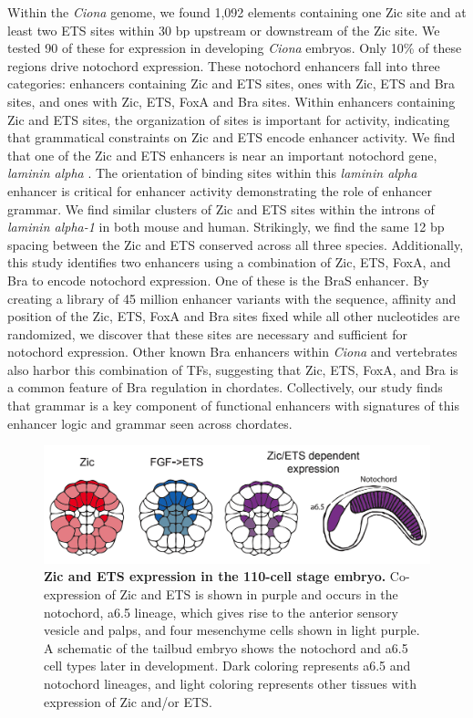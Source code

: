 Within the \textit{Ciona} genome, we found 1,092 elements containing one Zic site and at least two ETS sites within 30 bp upstream or downstream of the Zic site. We tested 90 of these for expression in developing \textit{Ciona} embryos. Only 10\% of these regions drive notochord expression. These notochord enhancers fall into three categories: enhancers containing Zic and ETS sites, ones with Zic, ETS and Bra sites, and ones with Zic, ETS, FoxA and Bra sites. Within enhancers containing Zic and ETS sites, the organization of sites is important for activity, indicating that grammatical constraints on Zic and ETS encode enhancer activity. We find that one of the Zic and ETS enhancers is near an important notochord gene, \textit{laminin alpha} \cite{veeman2008}. The orientation of binding sites within this \textit{laminin alpha} enhancer is critical for enhancer activity demonstrating the role of enhancer grammar.  We find similar clusters of Zic and ETS sites within the introns of \textit{laminin alpha-1} in both mouse and human. Strikingly, we find the same 12 bp spacing between the Zic and ETS conserved across all three species. Additionally, this study identifies two enhancers using a combination of Zic, ETS, FoxA, and Bra to encode notochord expression. One of these is the BraS enhancer. By creating a library of 45 million enhancer variants with the sequence, affinity and position of the Zic, ETS, FoxA and Bra sites fixed while all other nucleotides are randomized, we discover that these sites are necessary and sufficient for notochord expression. Other known Bra enhancers within \textit{Ciona} \cite{corbo1997} and vertebrates \cite{schifferl2021} also harbor this combination of TFs, suggesting that Zic, ETS, FoxA, and Bra is a common feature of Bra regulation in chordates. Collectively, our study finds that grammar is a key component of functional enhancers with signatures of this enhancer logic and grammar seen across chordates. 

\begin{figure}[h]
    \centering
    \includegraphics[scale=0.25]{2_figures-and-files/Fig1_ZicEts-Expression.png}
    \caption[Zic and ETS expression in the 110-cell stage embryo]{\textbf{Zic and ETS expression in the 110-cell stage embryo.} Co-expression of Zic and ETS is shown in purple and occurs in the notochord, a6.5 lineage, which gives rise to the anterior sensory vesicle and palps, and four mesenchyme cells shown in light purple. A schematic of the tailbud embryo shows the notochord and a6.5 cell types later in development. Dark coloring represents a6.5 and notochord lineages, and light coloring represents other tissues with expression of Zic and/or ETS.}
    \label{fig:1 zic ets expression}
\end{figure}

